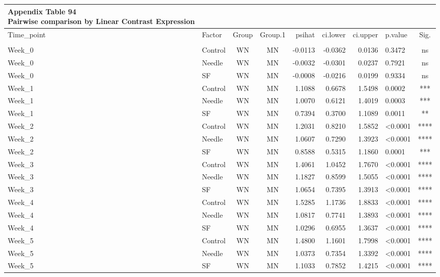 \documentclass[
  12pt,
  letterpaper,
]{article}
\begin{document}
\begingroup
\fontsize{12.0pt}{14.4pt}\selectfont
\begin{longtable}{llccrrrlc}
\caption*{
{\large \textbf{Appendix Table 94}} \\ 
{\small \textbf{Pairwise comparison by Linear Contrast Expression}}
} \\ 
\toprule
Time\_point & {Factor} & {Group} & {Group.1} & {psihat} & {ci.lower} & {ci.upper} & {p.value} & {Sig.} \\ 
\midrule\addlinespace[2.5pt]
\multicolumn{9}{l}{Split by Route} \\[2.5pt] 
\midrule\addlinespace[2.5pt]
Week\_0 & Control & WN & MN & -0.0113 & -0.0362 & 0.0136 & 0.3472 & ns \\ 
Week\_0 & Needle & WN & MN & -0.0032 & -0.0301 & 0.0237 & 0.7921 & ns \\ 
Week\_0 & SF & WN & MN & -0.0008 & -0.0216 & 0.0199 & 0.9334 & ns \\ 
Week\_1 & Control & WN & MN & 1.1088 & 0.6678 & 1.5498 & 0.0002 & *** \\ 
Week\_1 & Needle & WN & MN & 1.0070 & 0.6121 & 1.4019 & 0.0003 & *** \\ 
Week\_1 & SF & WN & MN & 0.7394 & 0.3700 & 1.1089 & 0.0011 & ** \\ 
Week\_2 & Control & WN & MN & 1.2031 & 0.8210 & 1.5852 & <0.0001 & **** \\ 
Week\_2 & Needle & WN & MN & 1.0607 & 0.7290 & 1.3923 & <0.0001 & **** \\ 
Week\_2 & SF & WN & MN & 0.8588 & 0.5315 & 1.1860 & 0.0001 & *** \\ 
Week\_3 & Control & WN & MN & 1.4061 & 1.0452 & 1.7670 & <0.0001 & **** \\ 
Week\_3 & Needle & WN & MN & 1.1827 & 0.8599 & 1.5055 & <0.0001 & **** \\ 
Week\_3 & SF & WN & MN & 1.0654 & 0.7395 & 1.3913 & <0.0001 & **** \\ 
Week\_4 & Control & WN & MN & 1.5285 & 1.1736 & 1.8833 & <0.0001 & **** \\ 
Week\_4 & Needle & WN & MN & 1.0817 & 0.7741 & 1.3893 & <0.0001 & **** \\ 
Week\_4 & SF & WN & MN & 1.0296 & 0.6955 & 1.3637 & <0.0001 & **** \\ 
Week\_5 & Control & WN & MN & 1.4800 & 1.1601 & 1.7998 & <0.0001 & **** \\ 
Week\_5 & Needle & WN & MN & 1.0373 & 0.7354 & 1.3392 & <0.0001 & **** \\ 
Week\_5 & SF & WN & MN & 1.1033 & 0.7852 & 1.4215 & <0.0001 & **** \\ 

\end{longtable}
\end{document}
